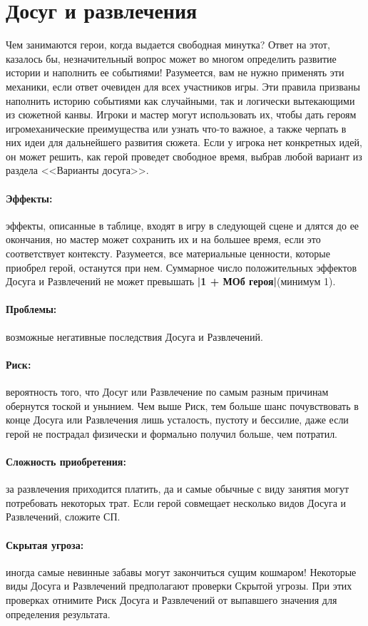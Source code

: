 \section{Досуг и развлечения}
Чем занимаются герои, когда выдается свободная минутка? Ответ на этот, казалось бы, незначительный вопрос может во многом определить развитие истории и наполнить ее событиями! Разумеется, вам не нужно применять эти механики, если ответ очевиден для всех участников игры. Эти правила призваны наполнить историю событиями как случайными, так и логически вытекающими из сюжетной канвы. Игроки и мастер могут использовать их, чтобы дать героям игромеханические преимущества или узнать что-то важное, а также черпать в них идеи для дальнейшего развития сюжета. Если у игрока нет конкретных идей, он может решить, как герой проведет свободное время, выбрав любой вариант из раздела <<Варианты досуга>>.
\paragraph{Эффекты:} эффекты, описанные в таблице, входят в игру в следующей сцене и длятся до ее окончания, но мастер может сохранить их и на большее время, если это соответствует контексту. Разумеется, все материальные ценности, которые приобрел герой, останутся при нем. Суммарное число положительных эффектов Досуга и Развлечений не может превышать \textbf{|1 + МОб героя|}(минимум 1).
\paragraph{Проблемы:} возможные негативные последствия Досуга и Развлечений.
\paragraph{Риск:} вероятность того, что Досуг или Развлечение по самым разным причинам обернутся тоской и унынием. Чем выше Риск, тем больше шанс почувствовать в конце Досуга или Развлечения лишь усталость, пустоту и бессилие, даже если герой не пострадал физически и формально получил больше, чем потратил.
\paragraph{Сложность приобретения:} за развлечения приходится платить, да и самые обычные с виду занятия могут потребовать некоторых трат. Если герой совмещает несколько видов Досуга и Развлечений, сложите СП.
\paragraph{Скрытая угроза:} иногда самые невинные забавы могут закончиться сущим кошмаром! Некоторые виды Досуга и Развлечений предполагают проверки Скрытой угрозы. При этих проверках отнимите Риск Досуга и Развлечений от выпавшего значения для определения результата.
